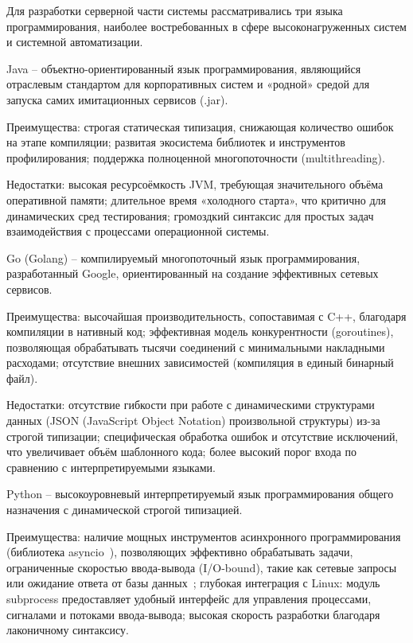 
Для разработки серверной части системы рассматривались три языка программирования, наиболее востребованных в сфере высоконагруженных систем и системной автоматизации.

Java -- объектно-ориентированный язык программирования, являющийся отраслевым стандартом для корпоративных систем и «родной» средой для запуска самих имитационных сервисов (.jar).

Преимущества: строгая статическая типизация, снижающая количество ошибок на этапе компиляции; развитая экосистема библиотек и инструментов профилирования; поддержка полноценной многопоточности (multithreading).

Недостатки: высокая ресурсоёмкость JVM, требующая значительного объёма оперативной памяти; длительное время «холодного старта», что критично для динамических сред тестирования; громоздкий синтаксис для простых задач взаимодействия с процессами операционной системы.

Go (Golang) -- компилируемый многопоточный язык программирования, разработанный Google, ориентированный на создание эффективных сетевых сервисов.

Преимущества: высочайшая производительность, сопоставимая с C++, благодаря компиляции в нативный код; эффективная модель конкурентности (goroutines), позволяющая обрабатывать тысячи соединений с минимальными накладными расходами; отсутствие внешних зависимостей (компиляция в единый бинарный файл).

Недостатки: отсутствие гибкости при работе с динамическими структурами данных (JSON (JavaScript Object Notation) произвольной структуры) из-за строгой типизации; специфическая обработка ошибок и отсутствие исключений, что увеличивает объём шаблонного кода; более высокий порог входа по сравнению с интерпретируемыми языками.

Python -- высокоуровневый интерпретируемый язык программирования общего назначения с динамической строгой типизацией.

Преимущества: наличие мощных инструментов асинхронного программирования (библиотека asyncio~\cite{python-asyncio}), позволяющих эффективно обрабатывать задачи, ограниченные скоростью ввода-вывода (I/O-bound), такие как сетевые запросы или ожидание ответа от базы данных~\cite{ramalho-python}; глубокая интеграция с Linux: модуль subprocess предоставляет удобный интерфейс для управления процессами, сигналами и потоками ввода-вывода; высокая скорость разработки благодаря лаконичному синтаксису.

